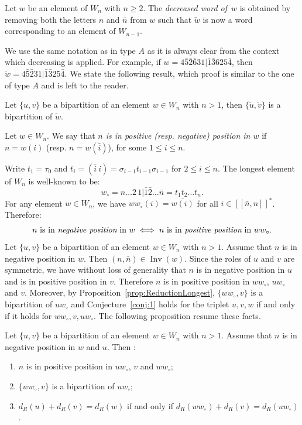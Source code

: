 \documentclass[Unicode]{cedram-alco}
\theoremstyle{definition}
\DeclareMathOperator{\invs}{Inv}
\newcommand{\dec}[1]{\widetilde{#1}}
\newcommand{\Bsetnn}{[\![\bar{n},n ]\!]^*}
\begin{document}
\begin{defi}
Let $w$ be an element of $W_n$ with $n \geq 2$. The \emph{decreased word of}~$w$ is obtained by removing both the letters $n$ and $\bar{n}$ from $w$ such that $\dec{w}$ is now a word corresponding to an element of $W_{n-1}$.
\end{defi}

We use the same notation as in type $A$ as it is always clear from the context which decreasing is applied. For example, if $w = 4 \bar{5} \bar{2} \bar{6} 3 1 | \bar{1} \bar{3} 6 2 5 \bar{4}$, then $\dec{w} = 4 \bar{5} \bar{2} 3 1 | \bar{1} \bar{3} 2 5 \bar{4}$. We state the following result, which proof is similar to the one of type $A$ and is left to the reader.

\begin{lemm}
\label{lem:B-dec}
Let $\lbrace u, v \rbrace$ be a bipartition of an element $w \in W_n$ with $n > 1$, then $\lbrace \dec{u}, \dec{v} \rbrace$ is a bipartition of $\dec{w}$.
\end{lemm}



\begin{defi} Let $w\in W_n$. We say that {\em $n$ is in positive (resp. negative) position in $w$} if $n=w(i)$ (resp. $n=w(\bar i)$), for some $1\leq i\leq n$. 
\end{defi}

Write $t_1=\tau_0$ and $t_{i}=(\bar i\ i)=\sigma_{i-1}t_{i-1} \sigma_{i-1}$ for $2\leq i\leq n$.  The longest element of $W_n$ is well-known to be:
$$
w_\circ= n \dots 2\,1 |\bar 1  \bar 2\dots \bar n = t_1t_2\dots t_n.
$$
For any element $w\in W_n$, we have $ww_\circ (i)=\overline{w(i)}$ for all $i\in \Bsetnn$. Therefore:
$$
 n  \textrm{ is in {\em negative position} in }w \iff n \textrm{ is in {\em positive position} in }ww_\circ. 
$$
Let $\lbrace u, v \rbrace$ be a bipartition of an element $w \in W_n$ with $n > 1$. Assume that $n$ is in negative position in $w$. Then $(n,\bar n)\in\invs(w)$. Since the roles of $u$ and $v$ are symmetric, we have without loss of generality that  $n$ is in negative position in $u$ and is in positive position in $v$. Therefore $n$ is in positive position in $ww_\circ$, $uw_\circ$ and $v$. Moreover, by Proposition~\ref{prop:ReductionLongest}, $\{ww_\circ,v\}$ is a bipartition of $uw_\circ$ and Conjecture~\ref{conj:1} holds for the triplet $u,v,w$ if and only if it holds for $ww_\circ,v,uw_\circ$. The following proposition resume these facts.
\begin{prop}
\label{prop:B-pos}
Let $\lbrace u, v \rbrace$ be a bipartition of an element $w \in W_n$ with $n > 1$. Assume that $n$ is in negative position in $w$ and $u$. Then :
\begin{enumerate}
\item $n$ is in positive position in $uw_\circ$, $v$ and $ww_\circ$;
\item $\{ww_\circ,v\}$ is a bipartition of $uw_\circ$;
\item $d_R(u)+d_R(v)=d_R(w)$ if and only if $d_R(ww_\circ)+d_R(v)=d_R(uw_\circ)$.
\end{enumerate}
\end{prop}
\end{document}
